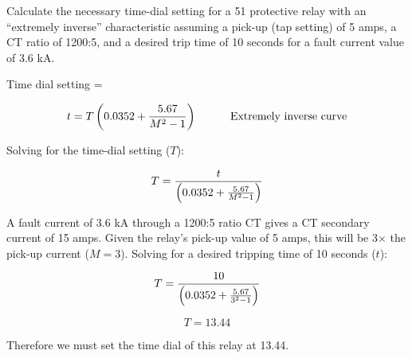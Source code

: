 

Calculate the necessary time-dial setting for a 51 protective relay with an ``extremely inverse'' characteristic assuming a pick-up (tap setting) of 5 amps, a CT ratio of 1200:5, and a desired trip time of 10 seconds for a fault current value of 3.6 kA.

\vskip 10pt

Time dial setting = \underbar{\hskip 50pt}

\vskip 10pt







$$t = T \left(0.0352 + {5.67 \over {M^2 - 1}} \right) \hskip 30pt \hbox{Extremely inverse curve}$$

Solving for the time-dial setting ($T$):

$$T = {t \over \left(0.0352 + {5.67 \over {M^2 - 1}} \right)}$$

A fault current of 3.6 kA through a 1200:5 ratio CT gives a CT secondary current of 15 amps.  Given the relay's pick-up value of 5 amps, this will be 3$\times$ the pick-up current ($M = 3$).  Solving for a desired tripping time of 10 seconds ($t$):

$$T = {10 \over \left(0.0352 + {5.67 \over {3^2 - 1}} \right)}$$

$$T = 13.44$$

Therefore we must set the time dial of this relay at 13.44.










